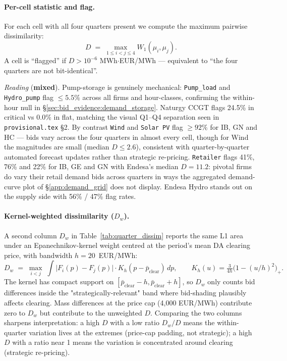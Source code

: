 \documentclass[11pt,a4paper]{article}
\begin{document}
\paragraph{Per-cell statistic and flag.} For each cell with all four quarters present we compute the maximum pairwise dissimilarity:
\[
   D \;=\; \max_{1 \leq i < j \leq 4} W_1(\mu_i, \mu_j).
\]
A cell is ``flagged'' if $D > 10^{-6}$ MWh$\cdot$EUR/MWh --- equivalent to ``the four quarters are not bit-identical''.



\textit{Reading} (\textbf{mixed}). Pump-storage is genuinely mechanical: \texttt{Pump\_load} and \texttt{Hydro\_pump} flag $\le 5.5\%$ across all firms and hour-classes, confirming the within-hour null in §\ref{sec:bid_evidence:demand_storage}. Naturgy CCGT flags 24.5\% in critical vs 0.0\% in flat, matching the visual Q1--Q4 separation seen in \texttt{provisional.tex} §2. By contrast \texttt{Wind} and \texttt{Solar PV} flag $\ge 92\%$ for IB, GN and HC --- bids vary across the four quarters in almost every cell, though for Wind the magnitudes are small (median $D \le 2.6$), consistent with quarter-by-quarter automated forecast updates rather than strategic re-pricing. \texttt{Retailer} flags 41\%, 76\% and 22\% for IB, GE and GN with Endesa's median $D = 11.2$: pivotal firms do vary their retail demand bids across quarters in ways the aggregated demand-curve plot of §\ref{app:demand_grid} does not display. Endesa Hydro stands out on the supply side with 56\% / 47\% flag rates.

\paragraph{Kernel-weighted dissimilarity ($D_w$).} A second column $D_w$ in Table~\ref{tab:quarter_dissim} reports the same L1 area under an Epanechnikov-kernel weight centred at the period's mean DA clearing price, with bandwidth $h = 20$~EUR/MWh:
\[
   D_w \;=\; \max_{i<j}\;\int \bigl|F_i(p) - F_j(p)\bigr| \cdot K_h(p - \bar p_{\text{clear}}) \, dp,
   \qquad K_h(u) = \tfrac{3}{4h}\bigl(1 - (u/h)^2\bigr)_+.
\]
The kernel has compact support on $[\bar p_{\text{clear}} - h, \bar p_{\text{clear}} + h]$, so $D_w$ only counts bid differences inside the "strategically-relevant" band where bid-shading plausibly affects clearing. Mass differences at the price cap (4{,}000 EUR/MWh) contribute zero to $D_w$ but contribute to the unweighted $D$. Comparing the two columns sharpens interpretation: a high $D$ with a low ratio $D_w / D$ means the within-quarter variation lives at the extremes (price-cap padding, not strategic); a high $D$ with a ratio near 1 means the variation is concentrated around clearing (strategic re-pricing).
\end{document}
